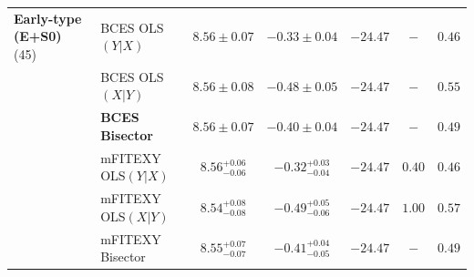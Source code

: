 \documentclass[preprint2]{emulateapj}
\begin{document}
\begin{table}
\begin{tabular}{llccccc}
%
%
{\bf Early-type (E+S0)} (45) & BCES OLS$(Y|X)$    & $8.56 \pm 0.07$ & $-0.33 \pm 0.04$ & $-24.47$ & $-$    & $0.46$ \\
 		      	     & BCES OLS$(X|Y)$    & $8.56 \pm 0.08$ & $-0.48 \pm 0.05$ & $-24.47$ & $-$    & $0.55$ \\
 		      	     & {\bf BCES Bisector}& $\boldsymbol{8.56 \pm 0.07}$ & $\boldsymbol{-0.40 \pm 0.04}$ & $\boldsymbol{-24.47}$ & $-$    & $\boldsymbol{0.49}$ \\
 		      	     & mFITEXY OLS$(Y|X)$ & $8.56^{+0.06}_{-0.06}$ & $-0.32^{+0.03}_{-0.04}$ & $-24.47$ & $0.40$ & $0.46$ \\
 		      	     & mFITEXY OLS$(X|Y)$ & $8.54^{+0.08}_{-0.08}$ & $-0.49^{+0.05}_{-0.06}$ & $-24.47$ & $1.00$ & $0.57$\\
 		      	     & mFITEXY Bisector   & $8.55^{+0.07}_{-0.07}$ & $-0.41^{+0.04}_{-0.05}$ & $-24.47$ & $-$	 & $0.49$ \\


\end{tabular}
\end{table}
\end{document}

